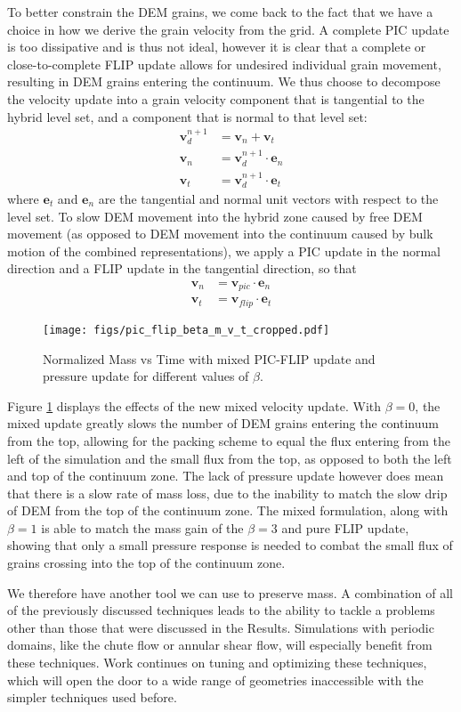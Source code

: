 To better constrain the DEM grains, we come back to the fact that we have a choice in how we derive the grain velocity from the grid. A complete PIC update is too dissipative and is thus not ideal, however it is clear that a complete or close-to-complete FLIP update allows for undesired individual grain movement, resulting in DEM grains entering the continuum. We thus choose to decompose the velocity update into a grain velocity component that is tangential to the hybrid level set, and a component that is normal to that level set:
\begin{align}
\bm{v}^{n+1}_d &= \bm{v}_n+\bm{v}_t\\
\bm{v}_n &= \bm{v}^{n+1}_d \cdot \bm{e}_n \\
\bm{v}_t &= \bm{v}^{n+1}_d \cdot \bm{e}_t
\end{align}
where $\bm{e}_t$ and $\bm{e}_n$ are the tangential and normal unit vectors with respect to the level set. To slow DEM movement into the hybrid zone caused by free DEM movement (as opposed to DEM movement into the continuum caused by bulk motion of the combined representations), we apply a PIC update in the normal direction and a FLIP update in the tangential direction, so that
\begin{align}
\bm{v}_n &= \bm{v}_{pic} \cdot \bm{e}_n \\
\bm{v}_t &= \bm{v}_{flip} \cdot \bm{e}_t
\end{align}

\begin{figure}[htp] 
    \centering
    \texttt{[image: figs/pic\_flip\_beta\_m\_v\_t\_cropped.pdf]}
    \caption{Normalized Mass vs Time with mixed PIC-FLIP update and pressure update for different values of $\beta$.}
    \label{pic_flip_beta_m_v_t}
\end{figure}

Figure \ref{pic_flip_beta_m_v_t} displays the effects of the new mixed velocity update. With $\beta=0$, the mixed update greatly slows the number of DEM grains entering the continuum from the top, allowing for the packing scheme to equal the flux entering from the left of the simulation and the small flux from the top, as opposed to both the left and top of the continuum zone.  The lack of pressure update however does mean that there is a slow rate of mass loss, due to the inability to match the slow drip of DEM from the top of the continuum zone. The mixed formulation, along with $\beta=1$ is able to match the mass gain of the $\beta=3$ and pure FLIP update, showing that only a small pressure response is needed to combat the small flux of grains crossing into the top of the continuum zone.

We therefore have another tool we can use to preserve mass. A combination of all of the previously discussed techniques leads to the ability to tackle a problems other than those that were discussed in the Results. Simulations with periodic domains, like the chute flow or annular shear flow, will especially benefit from these techniques. Work continues on tuning and optimizing these techniques, which will open the door to a wide range of geometries inaccessible with the simpler techniques used before.